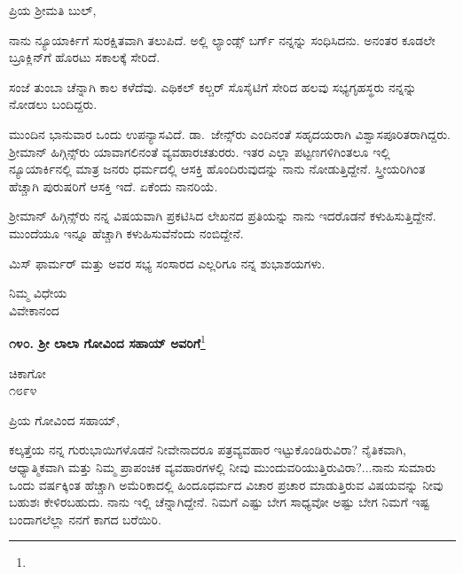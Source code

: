 \noindent
ಪ್ರಿಯ ಶ‍್ರೀಮತಿ ಬುಲ್,

ನಾನು ನ್ಯೂಯಾರ್ಕಿಗೆ ಸುರಕ್ಷಿತವಾಗಿ ತಲುಪಿದೆ. ಅಲ್ಲಿ ಲ್ಯಾಂಡ್ಸ್ ಬರ್ಗ್ ನನ್ನನ್ನು ಸಂಧಿಸಿದನು. ಅನಂತರ ಕೂಡಲೇ ಬ್ರೂಕ್ಲಿನ್‌ಗೆ ಹೊರಟು ಸಕಾಲಕ್ಕೆ ಸೇರಿದೆ.

ಸಂಜೆ ತುಂಬಾ ಚೆನ್ನಾಗಿ ಕಾಲ ಕಳೆದೆವು. ಎಥಿಕಲ್ ಕಲ್ಚರ್ ಸೊಸೈಟಿಗೆ ಸೇರಿದ ಹಲವು ಸಭ್ಯಗೃಹಸ್ಥರು ನನ್ನನ್ನು ನೋಡಲು ಬಂದಿದ್ದರು.

ಮುಂದಿನ ಭಾನುವಾರ ಒಂದು ಉಪನ್ಯಾಸವಿದೆ. ಡಾ.~ಜೇನ್ಸ್‌ರು ಎಂದಿನಂತೆ ಸಹೃದಯರಾಗಿ ವಿಶ್ವಾಸಪೂರಿತರಾಗಿದ್ದರು. ಶ‍್ರೀಮಾನ್ ಹಿಗ್ಗಿನ್ಸ್‌ರು ಯಾವಾಗಲಿನಂತೆ ವ್ಯವಹಾರಚತುರರು. ಇತರ ಎಲ್ಲಾ ಪಟ್ಟಣಗಳಿಗಿಂತಲೂ ಇಲ್ಲಿ ನ್ಯೂಯಾರ್ಕಿನಲ್ಲಿ ಮಾತ್ರ ಜನರು ಧರ್ಮದಲ್ಲಿ ಆಸಕ್ತಿ ಹೊಂದಿರುವುದನ್ನು ನಾನು ನೋಡುತ್ತಿದ್ದೇನೆ. ಸ್ತ್ರೀಯರಿಗಿಂತ ಹೆಚ್ಚಾಗಿ ಪುರುಷರಿಗೆ ಆಸಕ್ತಿ ಇದೆ. ಏಕೆಂದು ನಾನರಿಯೆ.

ಶ‍್ರೀಮಾನ್ ಹಿಗ್ಗಿನ್ಸ್‌ರು ನನ್ನ ವಿಷಯವಾಗಿ ಪ್ರಕಟಿಸಿದ ಲೇಖನದ ಪ್ರತಿಯನ್ನು ನಾನು ಇದರೊಡನೆ ಕಳುಹಿಸುತ್ತಿದ್ದೇನೆ. ಮುಂದೆಯೂ ಇನ್ನೂ ಹೆಚ್ಚಾಗಿ ಕಳುಹಿಸುವೆನೆಂದು ನಂಬಿದ್ದೇನೆ.

ಮಿಸ್‌ ಫಾರ್ಮರ್ ಮತ್ತು ಅವರ ಸಭ್ಯ ಸಂಸಾರದ ಎಲ್ಲರಿಗೂ ನನ್ನ ಶುಭಾಶಯಗಳು.

\vspace{-0.45cm}

{\flushright
ನಿಮ್ಮ ವಿಧೇಯ\\ವಿವೇಕಾನಂದ\par}

\vspace{-0.45cm}

\begin{center}
\textbf{೧೪೦. ಶ‍್ರೀ ಲಾಲಾ ಗೋವಿಂದ ಸಹಾಯ್ ಅವರಿಗೆ}\footnote{}
\end{center}

\vspace{-0.73cm}

\begin{flushright}
ಚಿಕಾಗೋ\\೧೮೯೪
\end{flushright}

\vspace{-0.5cm}

\noindent
ಪ್ರಿಯ ಗೋವಿಂದ ಸಹಾಯ್,

ಕಲ್ಕತ್ತೆಯ ನನ್ನ ಗುರುಭಾಯಿಗಳೊಡನೆ ನೀವೇನಾದರೂ ಪತ್ರವ್ಯವಹಾರ ಇಟ್ಟುಕೊಂಡಿರುವಿರಾ? ನೈತಿಕವಾಗಿ, ಆಧ್ಯಾತ್ಮಿಕವಾಗಿ ಮತ್ತು ನಿಮ್ಮ ಪ್ರಾಪಂಚಿಕ ವ್ಯವಹಾರಗಳಲ್ಲಿ ನೀವು ಮುಂದುವರಿಯುತ್ತಿರುವಿರಾ?...ನಾನು ಸುಮಾರು ಒಂದು ವರ್ಷಕ್ಕಿಂತ ಹೆಚ್ಚಾಗಿ ಅಮೆರಿಕಾದಲ್ಲಿ ಹಿಂದೂಧರ್ಮದ ವಿಚಾರ ಪ್ರಚಾರ ಮಾಡುತ್ತಿರುವ ವಿಷಯವನ್ನು ನೀವು ಬಹುಶಃ ಕೇಳಿರಬಹುದು. ನಾನು ಇಲ್ಲಿ ಚೆನ್ನಾಗಿದ್ದೇನೆ. ನಿಮಗೆ ಎಷ್ಟು ಬೇಗ ಸಾಧ್ಯವೋ ಅಷ್ಟು ಬೇಗ ನಿಮಗೆ ಇಷ್ಟ ಬಂದಾಗಲೆಲ್ಲಾ ನನಗೆ ಕಾಗದ ಬರೆಯಿರಿ.

\vspace{-0.5cm}

